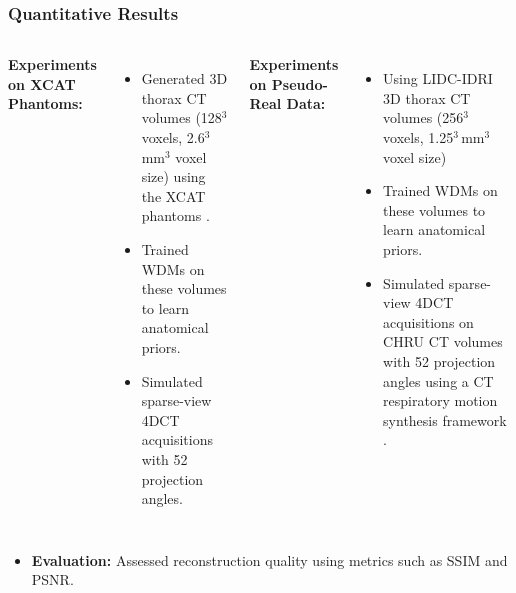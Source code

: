 \begin{frame}
  \frametitle{Quantitative Results}

  \begin{columns}[T]
    \textbf{Experiments on XCAT Phantoms:}
    \begin{itemize}
      \item Generated 3D thorax CT volumes (128$^3$ voxels, 2.6$^3$\,mm$^3$ voxel size) using the XCAT phantoms \cite{segars20104d}.
      \item Trained WDMs on these volumes to learn anatomical priors.
      \item Simulated sparse-view 4DCT acquisitions with 52 projection angles.
    \end{itemize}

    \pause  %

    \textbf{Experiments on Pseudo-Real Data:}
    \begin{itemize}
      \item Using LIDC-IDRI \cite{armato2011lung} 3D thorax CT volumes (256$^3$ voxels, 1.25$^3$\,mm$^3$ voxel size)
      \item Trained WDMs on these volumes to learn anatomical priors.
      \item Simulated sparse-view 4DCT acquisitions on CHRU CT volumes with 52 projection angles using a CT respiratory motion synthesis framework \cite{cao2024ct}.
    \end{itemize}
  \end{columns}

  \pause
  \begin{itemize}
    \item \textbf{Evaluation:} Assessed reconstruction quality using metrics such as SSIM and PSNR.
  \end{itemize}
\end{frame}


